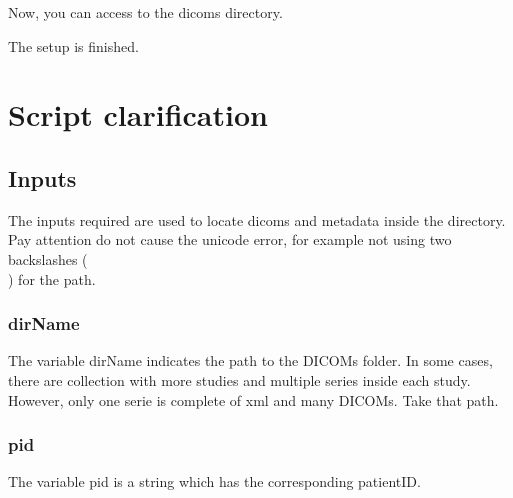 \documentclass[12pt]{article}
\begin{document}
Now, you can access to the dicoms directory.

\linebreak
The setup is finished.
	\pagebreak
	
	\section{Script clarification}\label{sec:clary}
	\subsection{Inputs}
	
The inputs required are used to locate dicoms and metadata inside the directory. 
Pay attention do not cause the unicode error, for example not using two backslashes (\\) for the path.

	\subsubsection{dirName}
The variable dirName indicates the path to the DICOMs folder. 
In some cases, there are collection with more studies and multiple series inside each study. 
However, only one serie is complete of xml and many DICOMs. 
Take that path.

	\subsubsection{pid}
The variable pid is a string which has the corresponding patientID.
\end{document}
